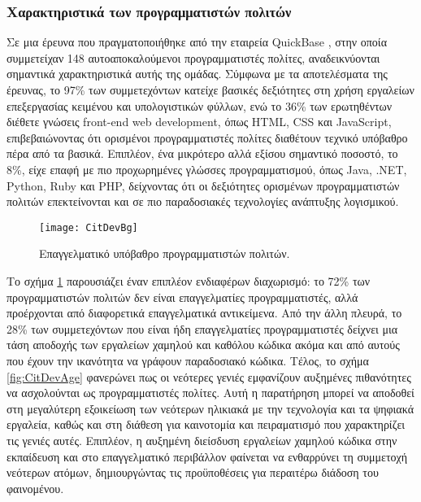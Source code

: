                 \subsubsection{Χαρακτηριστικά των προγραμματιστών πολιτών}
                    Σε μια έρευνα που πραγματοποιήθηκε από την εταιρεία QuickBase \cite{QuickBaseCitizenDevReport}, στην οποία συμμετείχαν 148 αυτοαποκαλούμενοι προγραμματιστές πολίτες, αναδεικνύονται σημαντικά χαρακτηριστικά αυτής της ομάδας. Σύμφωνα με τα αποτελέσματα της έρευνας, το 97\% των συμμετεχόντων κατείχε βασικές δεξιότητες στη χρήση εργαλείων επεξεργασίας κειμένου και υπολογιστικών φύλλων, ενώ το 36\% των ερωτηθέντων διέθετε γνώσεις front-end web development, όπως HTML, CSS και JavaScript, επιβεβαιώνοντας ότι ορισμένοι προγραμματιστές πολίτες διαθέτουν τεχνικό υπόβαθρο πέρα από τα βασικά. Επιπλέον, ένα μικρότερο αλλά εξίσου σημαντικό ποσοστό, το 8\%, είχε επαφή με πιο προχωρημένες γλώσσες προγραμματισμού, όπως Java, .NET, Python, Ruby και PHP, δείχνοντας ότι οι δεξιότητες ορισμένων προγραμματιστών πολιτών επεκτείνονται και σε πιο παραδοσιακές τεχνολογίες ανάπτυξης λογισμικού.

                    \begin{figure}[h!] \noindent \centering
                            \texttt{[image: CitDevBg]}
                            \caption{Επαγγελματικό υπόβαθρο προγραμματιστών πολιτών. \cite{LowCodeSimon}}
                            \label{fig:CitDevBg}
                    \end{figure}

                    Το σχήμα \ref{fig:CitDevBg} παρουσιάζει έναν επιπλέον ενδιαφέρων διαχωρισμό: το 72\% των προγραμματιστών πολιτών δεν είναι επαγγελματίες προγραμματιστές, αλλά προέρχονται από διαφορετικά επαγγελματικά αντικείμενα. Από την άλλη πλευρά, το 28\% των συμμετεχόντων που είναι ήδη επαγγελματίες προγραμματιστές δείχνει μια τάση αποδοχής των εργαλείων χαμηλού και καθόλου κώδικα ακόμα και από αυτούς που έχουν την ικανότητα να γράφουν παραδοσιακό κώδικα. Τέλος, το σχήμα \ref{fig:CitDevAge} φανερώνει πως οι νεότερες γενιές εμφανίζουν αυξημένες πιθανότητες να ασχολούνται ως προγραμματιστές πολίτες. Αυτή η παρατήρηση μπορεί να αποδοθεί στη μεγαλύτερη εξοικείωση των νεότερων ηλικιακά με την τεχνολογία και τα ψηφιακά εργαλεία, καθώς και στη διάθεση για καινοτομία και πειραματισμό που χαρακτηρίζει τις γενιές αυτές. Επιπλέον, η αυξημένη διείσδυση εργαλείων χαμηλού κώδικα στην εκπαίδευση και στο επαγγελματικό περιβάλλον φαίνεται να ενθαρρύνει τη συμμετοχή νεότερων ατόμων, δημιουργώντας τις προϋποθέσεις για περαιτέρω διάδοση του φαινομένου.

